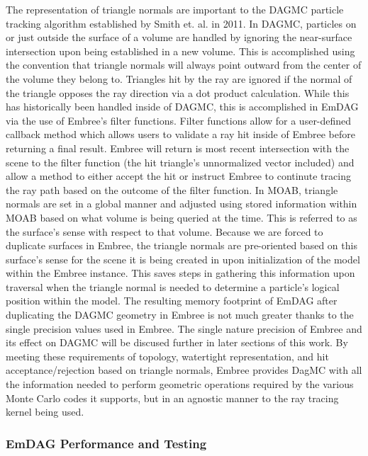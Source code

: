 \documentclass[12pt, a4paper]{article}
\begin{document}
The representation of triangle normals are important to the DAGMC particle tracking algorithm established by Smith et. al. \cite{smith_thesis_2011} in 2011. In DAGMC, particles on or just outside the surface of a volume are handled by ignoring the near-surface intersection upon being established in a new volume. This is accomplished using the convention that triangle normals will always point outward from the center of the volume they belong to. Triangles hit by the ray are ignored if the normal of the triangle opposes the ray direction via a dot product calculation. While this has historically been handled inside of DAGMC, this is accomplished in EmDAG via the use of Embree's filter functions. Filter functions allow for a user-defined callback method which allows users to validate a ray hit inside of Embree before returning a final result. Embree will return is most recent intersection with the scene to the filter function (the hit triangle's unnormalized vector included) and allow a method to either accept the hit or instruct Embree to continute tracing the ray path based on the outcome of the filter function. In MOAB, triangle normals are set in a global manner and adjusted using stored information within MOAB based on what volume is being queried at the time. This is referred to as the surface's sense with respect to that volume. Because we are forced to duplicate surfaces in Embree, the triangle normals are pre-oriented based on this surface's sense for the scene it is being created in upon initialization of the model within the Embree instance. This saves steps in gathering this information upon traversal when the triangle normal is needed to determine a particle's logical position within the model. The resulting memory footprint of EmDAG after duplicating the DAGMC geometry in Embree is not much greater thanks to the single precision values used in Embree. The single nature precision of Embree and its effect on DAGMC will be discused further in later sections of this work.
By meeting these requirements of topology, watertight representation, and hit acceptance/rejection based on triangle normals, Embree provides DagMC with all the information needed to perform geometric operations required by the various Monte Carlo codes it supports, but in an agnostic manner to the ray tracing kernel being used.

\subsubsection{EmDAG Performance and Testing}%
\end{document}
